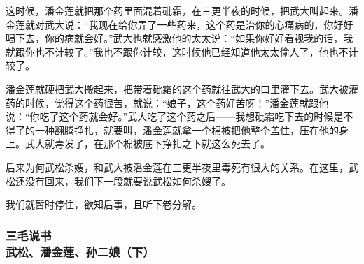 \par 这时候，潘金莲就把那个药里面混着砒霜，在三更半夜的时候，把武大叫起来。潘金莲就对武大说：“我现在给你弄了一些药来，这个药是治你的心痛病的，你好好喝下去，你的病就会好。”武大也就感激他的太太说：“如果你好好看视我的话，我就跟你也不计较了。”我也不跟你计较，这时候他已经知道他太太偷人了，他也不计较了。
\par 潘金莲就硬把武大搬起来，把带着砒霜的这个药就往武大的口里灌下去。武大被灌药的时候，觉得这个药很苦，就说：“娘子，这个药好苦呀！”潘金莲就跟他说：“你吃了这个药就会好。”武大吃了这个药之后——我想砒霜吃下去的时候是不得了的一种翻腾挣扎，就要叫，潘金莲就拿一个棉被把他整个盖住，压在他的身上。武大就毒发了，在那个棉被底下挣扎之下就这么死去了。
\par 后来为何武松杀嫂，和武大被潘金莲在三更半夜里毒死有很大的关系。在这里，武松还没有回来，我们下一段就要说武松如何杀嫂了。
\par 我们就暂时停住，欲知后事，且听下卷分解。


\subsubsection{三毛说书\\\small{武松、潘金莲、孙二娘（下）}}


